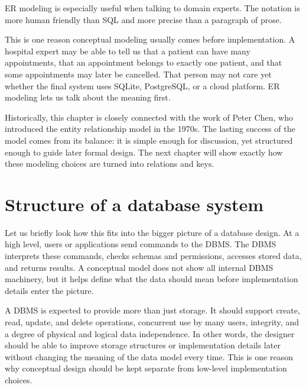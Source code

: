 \documentclass[11pt,a4paper,openany]{book}
\begin{document}
ER modeling is especially useful when talking to domain experts. The notation is more human friendly than SQL and more precise than a paragraph of prose.

This is one reason conceptual modeling usually comes before implementation. A hospital expert may be able to tell us that a patient can have many appointments, that an appointment belongs to exactly one patient, and that some appointments may later be cancelled. That person may not care yet whether the final system uses SQLite, PostgreSQL, or a cloud platform. ER modeling lets us talk about the meaning first.

Historically, this chapter is closely connected with the work of Peter Chen, who introduced the entity relationship model in the 1970s. The lasting success of the model comes from its balance: it is simple enough for discussion, yet structured enough to guide later formal design. The next chapter will show exactly how these modeling choices are turned into relations and keys.

\section{Structure of a database system}
Let us briefly look how this fits into the bigger picture of a database design.
At a high level, users or applications send commands to the DBMS. The DBMS interprets these commands, checks schemas and permissions, accesses stored data, and returns results. A conceptual model does not show all internal DBMS machinery, but it helps define what the data should mean before implementation details enter the picture.

A DBMS is expected to provide more than just storage. It should support create, read, update, and delete operations, concurrent use by many users, integrity, and a degree of physical and logical data independence. In other words, the designer should be able to improve storage structures or implementation details later without changing the meaning of the data model every time. This is one reason why conceptual design should be kept separate from low-level implementation choices.
\end{document}
